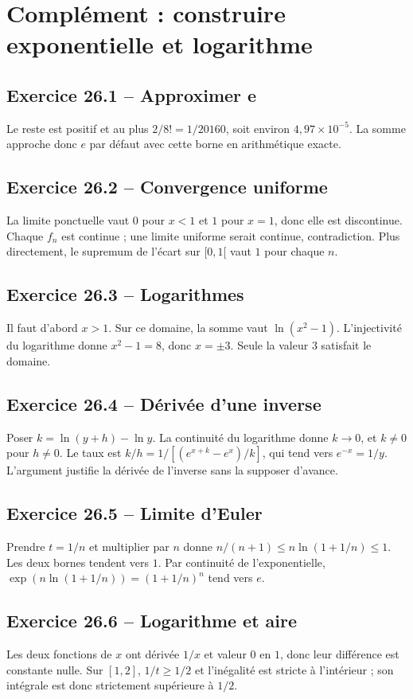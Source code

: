 \chapter{Complément : construire exponentielle et logarithme}
\section*{Exercice 26.1 -- Approximer e}
Le reste est positif et au plus $2/8!=1/20160$, soit environ $4{,}97\times10^{-5}$. La somme approche donc $e$ par défaut avec cette borne en arithmétique exacte.

\section*{Exercice 26.2 -- Convergence uniforme}
La limite ponctuelle vaut $0$ pour $x<1$ et $1$ pour $x=1$, donc elle est discontinue. Chaque $f_n$ est continue ; une limite uniforme serait continue, contradiction. Plus directement, le supremum de l'écart sur $[0,1[$ vaut $1$ pour chaque $n$.

\section*{Exercice 26.3 -- Logarithmes}
Il faut d'abord $x>1$. Sur ce domaine, la somme vaut $\ln(x^2-1)$. L'injectivité du logarithme donne $x^2-1=8$, donc $x=\pm3$. Seule la valeur $3$ satisfait le domaine.

\section*{Exercice 26.4 -- Dérivée d'une inverse}
Poser $k=\ln(y+h)-\ln y$. La continuité du logarithme donne $k\to0$, et $k\ne0$ pour $h\ne0$. Le taux est $k/h=1/[(e^{x+k}-e^x)/k]$, qui tend vers $e^{-x}=1/y$. L'argument justifie la dérivée de l'inverse sans la supposer d'avance.

\section*{Exercice 26.5 -- Limite d'Euler}
Prendre $t=1/n$ et multiplier par $n$ donne $n/(n+1)\le n\ln(1+1/n)\le1$. Les deux bornes tendent vers $1$. Par continuité de l'exponentielle, $\exp(n\ln(1+1/n))=(1+1/n)^n$ tend vers $e$.

\section*{Exercice 26.6 -- Logarithme et aire}
Les deux fonctions de $x$ ont dérivée $1/x$ et valeur $0$ en $1$, donc leur différence est constante nulle. Sur $[1,2]$, $1/t\ge1/2$ et l'inégalité est stricte à l'intérieur ; son intégrale est donc strictement supérieure à $1/2$.
